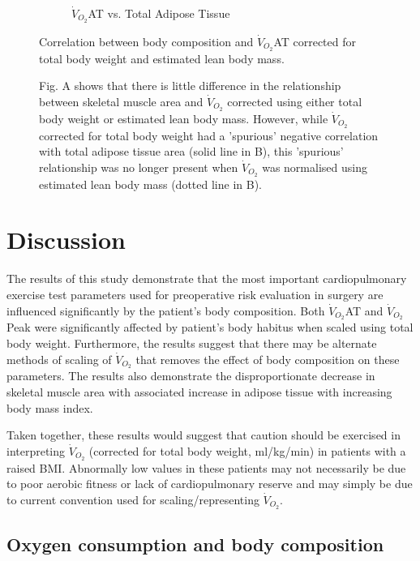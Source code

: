 \begin{figure}[htb]
\begin{subfigure}[b]{0.45\textwidth}
		\caption{$\dot{V}_{O_2}$AT vs. 
Total Adipose Tissue}
		\label{fig:bc_scatter_VO2_TAT_elbm}
	\end{subfigure}
	\caption{Correlation between body composition and $\dot{V}_{O_2}$AT corrected for total body weight and estimated lean body mass.}
	\caption*{Fig. A shows that there is little difference in the relationship between skeletal muscle area and $\dot{V}_{O_2}$ corrected using either total body weight or estimated lean body mass. However, while $\dot{V}_{O_2}$ corrected for total body weight had a 'spurious' negative correlation with total adipose tissue area (solid line in B), this 'spurious' relationship was no longer present when $\dot{V}_{O_2}$ was normalised using estimated lean body mass (dotted line in B).}
	\label{fig:bc_scatter_VO2_bodycomp_elbm}
\end{figure}



\clearpage

\section{Discussion}

The results of this study demonstrate that the most important cardiopulmonary exercise test parameters used for preoperative risk evaluation in surgery are influenced significantly by the patient's body composition. 
Both $\dot{V}_{O_2}$AT and $\dot{V}_{O_2}$Peak were significantly affected by patient's body habitus when scaled using total body weight. 
Furthermore, the results suggest that there may be alternate methods of scaling of $\dot{V}_{O_2}$ that removes the effect of body composition on these parameters. 
The results also demonstrate the disproportionate decrease in skeletal muscle area with associated increase in adipose tissue with increasing body mass index. 

Taken together, these results would suggest that caution should be exercised in interpreting $\dot{V}_{O_2}$ (corrected for total body weight, ml/kg/min) in patients with a raised BMI.
Abnormally low values in these patients may not necessarily be due to poor aerobic fitness or lack of cardiopulmonary reserve and may simply be due to current convention used for scaling/representing $\dot{V}_{O_2}$.

\subsection{Oxygen consumption and body composition}

